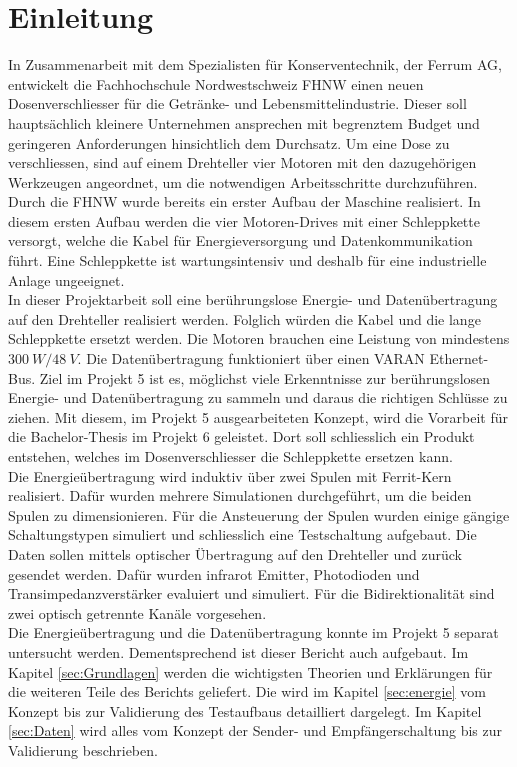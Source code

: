 \section{Einleitung}
In Zusammenarbeit mit dem Spezialisten für Konserventechnik, der Ferrum AG, entwickelt die Fachhochschule Nordwestschweiz FHNW einen neuen Dosenverschliesser für die Getränke- und Lebensmittelindustrie. Dieser soll hauptsächlich kleinere Unternehmen ansprechen mit begrenztem Budget und geringeren Anforderungen hinsichtlich dem Durchsatz. Um eine Dose zu verschliessen, sind auf einem Drehteller vier Motoren mit den dazugehörigen Werkzeugen angeordnet, um die notwendigen Arbeitsschritte durchzuführen. Durch die FHNW wurde bereits ein erster Aufbau der Maschine realisiert. In diesem ersten Aufbau werden die vier Motoren-Drives mit einer Schleppkette versorgt, welche die Kabel für Energieversorgung und Datenkommunikation führt. Eine Schleppkette ist wartungsintensiv und deshalb für eine industrielle Anlage ungeeignet.
\newline
\ \\
In dieser Projektarbeit soll eine berührungslose Energie- und Datenübertragung auf den Drehteller realisiert werden. Folglich würden die Kabel und die lange Schleppkette ersetzt werden. Die Motoren brauchen eine Leistung von mindestens $\SI{300}{W}/\SI{48}{V}$. Die Datenübertragung funktioniert über einen VARAN Ethernet-Bus. Ziel im Projekt 5 ist es, möglichst viele Erkenntnisse zur berührungslosen Energie- und Datenübertragung zu sammeln und daraus die richtigen Schlüsse zu ziehen. Mit diesem, im Projekt 5 ausgearbeiteten Konzept, wird die Vorarbeit für die Bachelor-Thesis im Projekt 6 geleistet. Dort soll schliesslich ein Produkt entstehen, welches im Dosenverschliesser die Schleppkette ersetzen kann.
\newline
\ \\
Die Energieübertragung wird induktiv über zwei Spulen mit Ferrit-Kern realisiert. Dafür wurden mehrere Simulationen durchgeführt, um die beiden Spulen zu dimensionieren. Für die Ansteuerung der Spulen wurden einige gängige Schaltungstypen simuliert und schliesslich eine Testschaltung aufgebaut. Die Daten sollen mittels optischer Übertragung auf den Drehteller und zurück gesendet werden. Dafür wurden infrarot Emitter, Photodioden und Transimpedanzverstärker evaluiert und simuliert. Für die Bidirektionalität sind zwei optisch getrennte Kanäle vorgesehen.
\newline
\ \\ 
Die Energieübertragung und die Datenübertragung konnte im Projekt 5 separat untersucht werden. Dementsprechend ist dieser Bericht auch aufgebaut. Im Kapitel \ref{sec:Grundlagen}  werden die wichtigsten Theorien und Erklärungen für die weiteren Teile des Berichts geliefert. Die  wird im Kapitel \ref{sec:energie} vom Konzept bis zur Validierung des Testaufbaus detailliert dargelegt. Im Kapitel \ref{sec:Daten}  wird alles vom Konzept der Sender- und Empfängerschaltung bis zur Validierung beschrieben.



